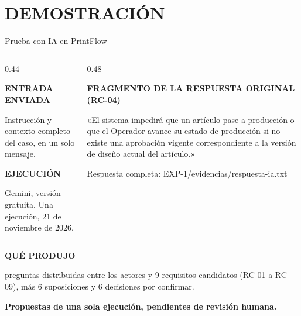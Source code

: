 \documentclass[aspectratio=169,12pt]{beamer}
\newcommand{\etiqueta}[1]{{\fontsize{7.5}{9}\selectfont\bfseries\color{Accent}#1\par}}
\newcommand{\fuentesactuales}{}
\newcommand{\fuentesdiapositiva}[1]{\gdef\fuentesactuales{#1}}
\begin{document}
\section{DEMOSTRACIÓN}
\begin{frame}[t]{Prueba con IA en PrintFlow}
\fuentesdiapositiva{}
\begin{columns}[T,onlytextwidth]
\begin{column}{0.44\textwidth}
\etiqueta{ENTRADA ENVIADA}
\vspace{1mm}
{\fontsize{10}{12.5}\selectfont Instrucción y contexto completo del caso, en un solo mensaje.\par}
\vspace{2mm}
\etiqueta{EJECUCIÓN}
\vspace{1mm}
{\fontsize{10}{12.5}\selectfont Gemini, versión gratuita. Una ejecución, 21 de noviembre de 2026.\par}
\end{column}
\begin{column}{0.48\textwidth}
\etiqueta{FRAGMENTO DE LA RESPUESTA ORIGINAL (RC-04)}
\vspace{1mm}
{\fontsize{9.5}{12}\selectfont «El sistema impedirá que un artículo pase a producción o que el Operador avance su estado de producción si no existe una aprobación vigente correspondiente a la versión de diseño actual del artículo.»\par}
\vspace{1mm}
{\fontsize{7.5}{9}\selectfont\color{Muted}Respuesta completa: EXP-1/evidencias/respuesta-ia.txt\par}
\end{column}
\end{columns}
\vspace{2mm}
\etiqueta{QUÉ PRODUJO}
\vspace{1mm}
{\fontsize{10}{12.5} preguntas distribuidas entre los actores y 9 requisitos candidatos (RC-01 a RC-09), más 6 suposiciones y 6 decisiones por confirmar.\par}
\vfill
{\fontsize{9}{11}\selectfont\color{Accent}\bfseries
Propuestas de una sola ejecución, pendientes de revisión humana.\par}
\vspace{1mm}
\end{frame}

\end{document}
